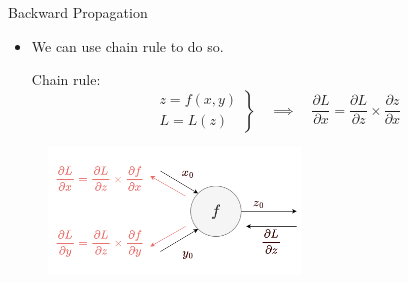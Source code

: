 \documentclass[compress,oilve,t]{beamer}
\begin{document}
\begin{frame}{Backward Propagation}
	\begin{itemize}
		\item We can use chain rule to do so.
		\medskip
		\begin{block}{Chain rule:}
			\[
			\left.\begin{aligned}
				& z = f(x, y)\\
				& L = L(z)
			\end{aligned}\right\}\quad\implies\quad \frac{\partial L}{\partial x} = \frac{\partial L}{\partial z}\times \frac{\partial z}{\partial x} 
			\]
		\end{block}
	\end{itemize}
	\begin{figure}[H]
		\centering
		\includegraphics[width=0.6\textwidth]{Figs/module_f_downstream.png}
	\end{figure}
\end{frame}
\end{document}
